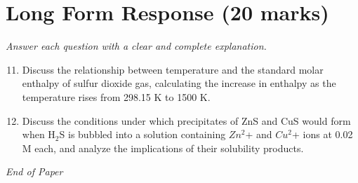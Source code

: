 \documentclass[12pt]{article}
\begin{document}
\section*{Long Form Response (20 marks)}
\textit{Answer each question with a clear and complete explanation.}
\begin{enumerate}[label=\arabic*.]
\setcounter{enumi}{10}
\item Discuss the relationship between temperature and the standard molar enthalpy of sulfur dioxide gas, calculating the increase in enthalpy as the temperature rises from 298.15 K to 1500 K.
\item Discuss the conditions under which precipitates of ZnS and CuS would form when H$_{2}$S is bubbled into a solution containing $Zn^2$+ and $Cu^2$+ ions at 0.02 M each, and analyze the implications of their solubility products.
\end{enumerate}

\vfill
\noindent\textit{End of Paper}
\end{document}
